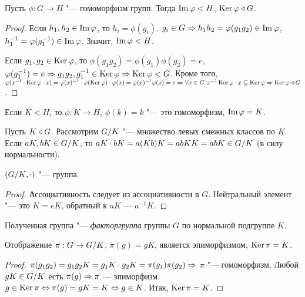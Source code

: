 \documentclass[main]{subfiles}
\begin{document}
\begin{proposition}
  Пусть $\phi : G \to H$ "--- гомоморфизм групп. Тогда $\operatorname{Im} \varphi < H$,
  $\operatorname{Ker} \varphi \triangleleft G$.
\end{proposition}
\begin{proof}
  Если $h_1, h_2 \in \operatorname{Im} \varphi$, то $h_i = \phi(g_i)$. $g_i \in G \Rightarrow
  h_1 h_2 = \varphi(g_1 g_2) \in \operatorname{Im} \varphi$, $h_1^{-1} = \varphi(g_1^{-1}) \in
  \operatorname{Im} \varphi$. Значит, $\operatorname{Im} \varphi < H$.

  Если $g_1, g_2 \in \operatorname{Ker} \varphi$, то $\phi(g_1 g_2) = \phi(g_1)\phi(g_2) = e$,
  $\varphi(g_1^{-1}) = e \Rightarrow g_1 g_2, g_1^{-1} \in \operatorname{Ker} \varphi \Rightarrow \operatorname{Ker} \varphi < G$.
  Кроме того, $\varphi(x^{-1} \cdot \operatorname{Ker} \varphi \cdot x) = \varphi(x)^{-1} \cdot
  \varphi(\operatorname{Ker} \varphi) \cdot \varphi(x) = \varphi(x)^{-1} \varphi(x) = e \Rightarrow
  \forall {x \in G} \; \, x^{-1} \operatorname{Ker} \varphi \cdot x \subseteq \operatorname{Ker} \varphi \Rightarrow
  \operatorname{Ker} \varphi \triangleleft G$.
\end{proof}

\begin{remark}
  Если $K < H$, то $\phi : K \to H$, $\phi(k) = k$ "--- это гомоморфизм,
  $\operatorname{Im} \varphi = K$.
\end{remark}

Пусть $K \triangleleft G$. Рассмотрим $\Factor{G}[K]$ "---
множество левых смежных классов по $K$.
Если $aK, bK \in \Factor{G}[K]$,
то $aK \cdot bK = a (Kb) K =  abKK = abK \in \Factor{G}[K]$
(в силу нормальности).

\begin{theorem}
  $(\Factor{G}[K], \cdot)$ "--- группа.
\end{theorem}
\begin{proof}
  Ассоциативность следует из ассоциативности в $G$.
  Нейтральный элемент "--- это $K = eK$,
  обратный к $aK$ --- $a^{-1} K$.
\end{proof}

\begin{definition}
  Полученная группа "--- \emph{факторгруппа}
  группы $G$ по нормальной подгруппе $K$.
\end{definition}

\begin{theorem}
  Отображение $\pi : G \to \Factor{G}[K]$, $\pi(g) = gK$,
  является эпиморфизмом,
  $\operatorname{Ker} \pi = K$.
\end{theorem}
\begin{proof}
  $\pi(g_1 g_2) = g_1 g_2 K =
  g_1 K \cdot g_2 K = \pi(g_1) \pi(g_2) \Rightarrow$
  $\pi$ "--- гомоморфизм.
  Любой $gK \in \Factor{G}[K]$ есть $\pi(g) \Rightarrow \pi$ --- эпиморфизм.
  $g \in \operatorname{Ker} \pi \Leftrightarrow \pi(g) = gK
  = K \Leftrightarrow g \in K$. Итак, $\operatorname{Ker} \pi = K$.
\end{proof}
\end{document}
